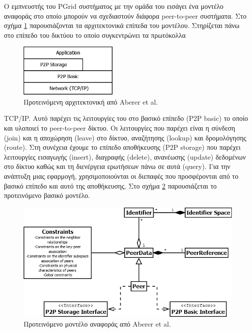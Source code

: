 Ο εμπνευστής του PGrid συστήματος με την ομάδα του εισάγει ένα 
μοντέλο αναφοράς \citep{Aberer05theessence} στο οποίο μπορούν να σχεδιαστούν 
διάφορα peer-to-peer συστήματα. Στο σχήμα \ref{fig:Essence} παρουσιάζονται τα 
αρχιτεκτονικά επίπεδα του μοντέλου. Στηρίζεται πάνω στο επίπεδο του 
δικτύου το οποίο συγκεντρώνει τα πρωτόκολλα   
\begin{figure}
  \begin{center}
    \includegraphics[width=0.43\textwidth]{Figures/Related_work/The_essence_of_p2p_(architecture).png}
  \end{center}
  \caption{Προτεινόμενη αρχιτεκτονική από Aberer et al.}
  \label{fig:Essence}
\end{figure}
TCP/IP. Αυτό παρέχει τις λειτουργίες του στο βασικό επίπεδο (P2P basic) το οποίο και υλοποιεί το 
peer-to-peer δίκτυο. Οι λειτουργίες που παρέχει είναι η σύνδεση (join) 
και η αποχώρηση (leave) στο δίκτυο, αναζήτησης (lookup) και δρομολόγησης 
(route). Στη συνέχεια έχουμε το επίπεδο αποθήκευσης (P2P storage) που 
παρέχει λειτουργίες εισαγωγής (insert), διαγραφής (delete), ανανέωσης 
(update) δεδομένων στο δίκτυο καθώς και τη διενέργεια ερωτήσεων πάνω σε 
αυτά (query). Για την ανάπτυξη μιας εφαρμογή, χρησιμοποιούνται οι 
διεπαφές που προσφέρονται από το βασικό επίπεδο και αυτό της 
αποθήκευσης. Στο σχήμα \ref{fig:Essence_UML} παρουσιάζεται το 
προτεινόμενο βασικό μοντέλο.

\begin{figure}[htbp]
  \begin{center}
    \includegraphics[scale=0.55]{Figures/Related_work/The_essence_of_p2p_(uml).png}
  \end{center}
  \caption{Προτεινόμενο μοντέλο αναφοράς από Aberer et al.}
  \label{fig:Essence_UML}
\end{figure}

